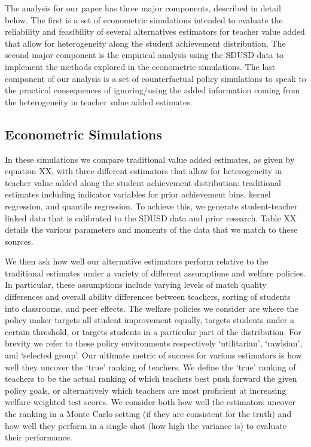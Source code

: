 \documentclass[letterpaper,12pt]{article}
\begin{document}
The analysis for our paper has three major components, described in detail below. The first is a set of econometric simulations intended to evaluate the reliability and feasibility of several alternatives estimators for teacher value added that allow for heterogeneity along the student achievement distribution. The second major component is the empirical analysis using the SDUSD data to implement the methods explored in the econometric simulations. The last component of our analysis is a set of counterfactual policy simulations to speak to the practical consequences of ignoring/using the added information coming from the heterogeneity in teacher value added estimates.



\subsection{Econometric Simulations}

In these simulations we compare traditional value added estimates, as given by equation XX, with three different estimators that allow for heterogeneity in teacher value added along the student achievement distribution: traditional estimates including indicator variables for prior achievement bins, kernel regression, and quantile regression. To achieve this, we generate student-teacher linked data that is calibrated to the SDUSD data and prior research. Table XX details the various parameters and moments of the data that we match to these sources. 

We then ask how well our alternative estimators perform relative to the traditional estimates under a variety of different assumptions and welfare policies. In particular, these assumptions include varying levels of match quality differences and overall ability differences between teachers, sorting of students into classrooms, and peer effects. The welfare policies we consider are where the policy maker targets all student improvement equally, targets students under a certain threshold, or targets students in a particular part of the distribution. For brevity we refer to these policy environments respectively `utilitarian', `rawlsian', and `selected group'. Our ultimate metric of success for various estimators is how well they uncover the `true' ranking of teachers. We define the `true' ranking of teachers to be the actual ranking of which teachers best push forward the given policy goals, or alternatively which teachers are most proficient at increasing welfare-weighted test scores. We consider both how well the estimators uncover the ranking in a Monte Carlo setting (if they are consistent for the truth) and how well they perform in a single shot (how high the variance is) to evaluate their performance.
\end{document}
